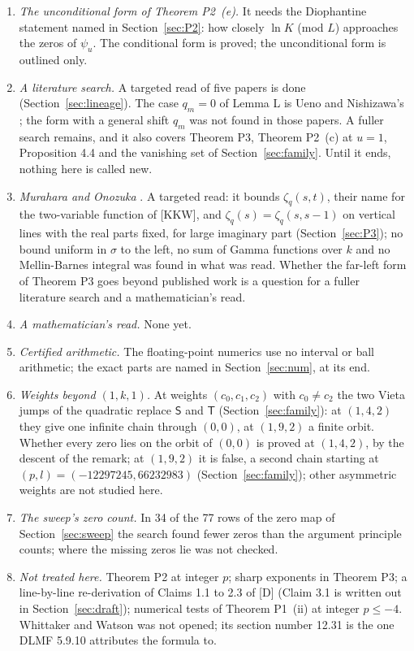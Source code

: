 \documentclass[11pt]{article}
\begin{document}
\begin{enumerate}
\item \emph{The unconditional form of Theorem P2~(e).} It needs the Diophantine statement named in Section~\ref{sec:P2}: how closely $\ln K$ (mod $L$) approaches the zeros of $\psi_u$. The conditional form is proved; the unconditional form is outlined only.
\item \emph{A literature search.} A targeted read of five papers is done (Section~\ref{sec:lineage}). The case $q_m=0$ of Lemma L is Ueno and Nishizawa's \cite{UN}; the form with a general shift $q_m$ was not found in those papers. A fuller search remains, and it also covers Theorem P3, Theorem P2~(c) at $u=1$, Proposition 4.4 and the vanishing set of Section~\ref{sec:family}. Until it ends, nothing here is called new.
\item \emph{Murahara and Onozuka} \cite{MO}. A targeted read: it bounds $\zeta_q(s,t)$, their name for the two-variable function of [KKW], and $\zeta_q(s)=\zeta_q(s,s-1)$ on vertical lines with the real parts fixed, for large imaginary part (Section~\ref{sec:P3}); no bound uniform in $\sigma$ to the left, no sum of Gamma functions over $k$ and no Mellin-Barnes integral was found in what was read. Whether the far-left form of Theorem P3 goes beyond published work is a question for a fuller literature search and a mathematician's read.
\item \emph{A mathematician's read.} None yet.
\item \emph{Certified arithmetic.} The floating-point numerics use no interval or ball arithmetic; the exact parts are named in Section~\ref{sec:num}, at its end.
\item \emph{Weights beyond $(1,k,1)$.} At weights $(c_0,c_1,c_2)$ with $c_0\ne c_2$ the two Vieta jumps of the quadratic replace $\mathsf{S}$ and $\mathsf{T}$ (Section~\ref{sec:family}): at $(1,4,2)$ they give one infinite chain through $(0,0)$, at $(1,9,2)$ a finite orbit. Whether every zero lies on the orbit of $(0,0)$ is proved at $(1,4,2)$, by the descent of the remark; at $(1,9,2)$ it is false, a second chain starting at $(p,l)=(-12297245,66232983)$ (Section~\ref{sec:family}); other asymmetric weights are not studied here.
\item \emph{The sweep's zero count.} In 34 of the 77 rows of the zero map of Section~\ref{sec:sweep} the search found fewer zeros than the argument principle counts; where the missing zeros lie was not checked.
\item \emph{Not treated here.} Theorem P2 at integer $p$; sharp exponents in Theorem P3; a line-by-line re-derivation of Claims 1.1 to 2.3 of [D] (Claim 3.1 is written out in Section~\ref{sec:draft}); numerical tests of Theorem P1~(ii) at integer $p\le-4$. Whittaker and Watson was not opened; its section number 12.31 is the one DLMF 5.9.10 attributes the formula to.
\end{enumerate}
\end{document}
